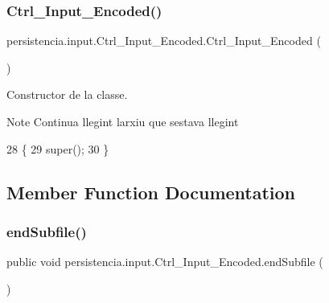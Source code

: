 \subsubsection{\texorpdfstring{Ctrl\+\_\+\+Input\+\_\+\+Encoded()}{Ctrl\_Input\_Encoded()}\hspace{0.1cm}{\footnotesize\ttfamily [2/2]}}
{\footnotesize\ttfamily persistencia.\+input.\+Ctrl\+\_\+\+Input\+\_\+\+Encoded.\+Ctrl\+\_\+\+Input\+\_\+\+Encoded (\begin{DoxyParamCaption}{ }\end{DoxyParamCaption})\hspace{0.3cm}{\ttfamily [inline]}}



Constructor de la classe. 

\begin{DoxyNote}{Note}
Continua llegint l\textquotesingle{}arxiu que s\textquotesingle{}estava llegint 
\end{DoxyNote}

\begin{DoxyCode}
28                                 \{
29         super();
30     \}
\end{DoxyCode}


\subsection{Member Function Documentation}
\mbox{\label{classpersistencia_1_1input_1_1Ctrl__Input__Encoded_a180970a90ac6d386472e5959f7cf3f9b}} 
\subsubsection{\texorpdfstring{end\+Subfile()}{endSubfile()}}
{\footnotesize\ttfamily public void persistencia.\+input.\+Ctrl\+\_\+\+Input\+\_\+\+Encoded.\+end\+Subfile (\begin{DoxyParamCaption}{ }\end{DoxyParamCaption})\hspace{0.3cm}{\ttfamily [inline]}}



